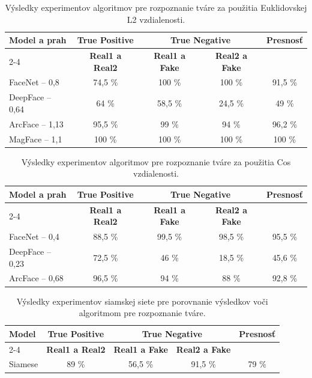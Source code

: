 \begin{table}[H]
\centering
\begin{tabular}{|l|c|c|c|c|}
\hline
\multirow{2}{*}{\textbf{Model a prah}} & \multicolumn{1}{|c|}{\textbf{True Positive}} & \multicolumn{2}{|c|}{\textbf{True Negative}} & \multirow{2}{*}{\textbf{Presnosť}} \\
\cline{2-4}
& \textbf{Real1 a Real2} & \textbf{Real1 a Fake} & \textbf{Real2 a Fake} & \\
\hline
FaceNet -- 0,8 & 74,5 \% & 100 \% & 100 \% & 91,5 \% \\
\hline
DeepFace -- 0,64 & 64 \% & 58,5 \% & 24,5 \% & 49 \% \\
\hline
ArcFace -- 1,13 & 95,5 \% & 99 \% & 94 \% & 96,2 \% \\
\hline
MagFace -- 1,1 & 100 \% & 100 \% & 100 \% & 100 \% \\
\hline
\end{tabular}
\caption{Výsledky experimentov algoritmov pre rozpoznanie tváre za použitia Euklidovskej L2 vzdialenosti.}
\label{tab:Face_rec_table_l2}
\end{table}

\begin{table}[H]
\centering
\begin{tabular}{|l|c|c|c|c|}
\hline
\multirow{2}{*}{\textbf{Model a prah}} & \multicolumn{1}{|c|}{\textbf{True Positive}} & \multicolumn{2}{|c|}{\textbf{True Negative}} & \multirow{2}{*}{\textbf{Presnosť}} \\
\cline{2-4}
& \textbf{Real1 a Real2} & \textbf{Real1 a Fake} & \textbf{Real2 a Fake} & \\
\hline
FaceNet -- 0,4 & 88,5 \% & 99,5 \% & 98,5 \% & 95,5 \% \\
\hline
DeepFace -- 0,23 & 72,5 \% & 46 \% & 18,5 \% & 45,6 \% \\
\hline
ArcFace -- 0,68 & 96,5 \% & 94 \% & 88 \% & 92,8 \% \\
\hline
\end{tabular}
\centering
\caption{Výsledky experimentov algoritmov pre rozpoznanie tváre za použitia Cos vzdialenosti.}
\label{tab:Face_rec_table_cos}
\end{table}

\begin{table}[H]
\centering
\begin{tabular}{|l|c|c|c|c|}
\hline
\multirow{2}{*}{\textbf{Model}} & \multicolumn{1}{|c|}{\textbf{True Positive}} & \multicolumn{2}{|c|}{\textbf{True Negative}} & \multirow{2}{*}{\textbf{Presnosť}} \\
\cline{2-4}
& \textbf{Real1 a Real2} & \textbf{Real1 a Fake} & \textbf{Real2 a Fake} & \\
\hline
Siamese & 89 \% & 56,5 \% & 91,5 \% & 79 \% \\
\hline
\end{tabular}
\centering
\caption{Výsledky experimentov siamskej siete pre porovnanie výsledkov voči algoritmom pre rozpoznanie tváre.}
\label{tab:Face_rec_table_siamese}
\end{table}

